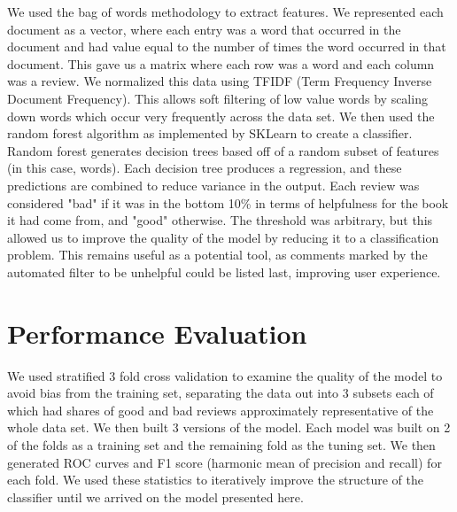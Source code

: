 \documentclass{article}
\begin{document}
\begin{multicols}{2}
We used the bag of words methodology to extract features. We represented each document as a vector, where each entry was a word that occurred in the document and had value equal to the number of times the word occurred in that document. This gave us a matrix where each row was a word and each column was a review. We normalized this data using TFIDF (Term Frequency Inverse Document Frequency). This allows soft filtering of low value words by scaling down words which occur very frequently across the data set. We then used the random forest algorithm as implemented by SKLearn\cite{sklearn} to create a classifier. Random forest generates decision trees based off of a random subset of features (in this case, words). Each decision tree produces a regression, and these predictions are combined to reduce variance in the output.\cite{forests} Each review was considered "bad" if it was in the bottom 10\% in terms of helpfulness for the book it had come from, and "good" otherwise. The threshold was arbitrary, but this allowed us to improve the quality of the model by reducing it to a classification problem. This remains useful as a potential tool, as comments marked by the automated filter to be unhelpful could be listed last, improving user experience.

\section{Performance Evaluation}

We used stratified 3 fold cross validation to examine the quality of the model to avoid bias from the training set, separating the data out into 3 subsets each of which had shares of good and bad reviews approximately representative of the whole data set. We then built 3 versions of the model. Each model was built on 2 of the folds as a training set and the remaining fold as the tuning set. We then generated ROC curves and F1 score (harmonic mean of precision and recall) for each fold. We used these statistics to iteratively improve the structure of the classifier until we arrived on the model presented here.


\end{multicols}
\end{document}
